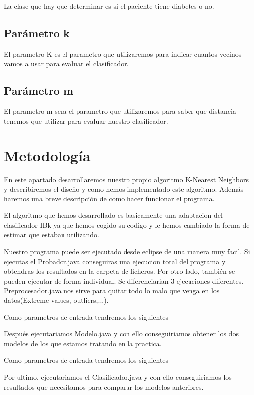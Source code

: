 \documentclass[a4paper,10pt]{article}
\theoremstyle{plain}
\begin{document}
La clase que hay que determinar es si el paciente tiene diabetes o no.

\subsection{Par\'ametro {\color{blue}k}}

El parametro K es el parametro que utilizaremos para indicar cuantos vecinos vamos a usar para evaluar el clasificador.

\subsection{Par\'ametro {\color{magenta}m}}

El parametro m sera el parametro que utilizaremos para saber que distancia tenemos que utilizar para evaluar nuestro clasificador.
    
\section{Metodolog\'ia}

En este apartado desarrollaremos nuestro propio algoritmo K-Nearest Neighbors y describiremos el diseño y como hemos implementado este algoritmo. Adem\'as haremos una breve descripci\'on de como hacer funcionar el programa.

El algoritmo que hemos desarrollado es basicamente una adaptacion del clasificador IBk ya que hemos cogido su codigo y le hemos cambiado la forma de estimar que estaban utilizando. 


Nuestro programa puede ser ejecutado desde eclipse de una manera muy facil. Si ejecutas el Probador.java conseguiras una ejecucion total del programa y obtendras los resultados en la carpeta de ficheros. Por otro lado, también se pueden ejecutar de forma individual. Se diferenciarian 3 ejecuciones diferentes. Preprocesador.java nos sirve para quitar todo lo malo que venga en los datos(Extreme values, outliers,...).

	Como parametros de entrada tendremos los siguientes

Después ejecutariamos Modelo.java y con ello conseguiriamos obtener los dos modelos de los que estamos tratando en la practica. 

	Como parametros de entrada tendremos los siguientes


Por ultimo, ejecutariamos el Clasificador.java y con ello conseguiriamos los resultados que necesitamos para comparar los modelos anteriores. 
\end{document}
